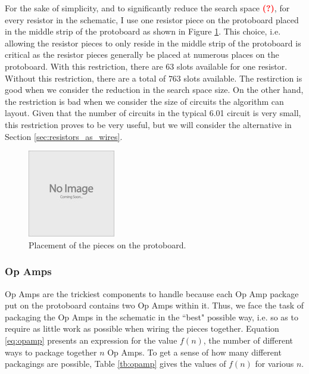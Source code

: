 For the sake of simplicity, and to significantly reduce the search space
\textcolor{red}{\textbf{(?)}}, for every resistor in the schematic, I use one
resistor piece on the protoboard placed in the middle strip of the protoboard
as shown in Figure \ref{fig:piece_placement}. This choice, i.e. allowing the
resistor pieces to only reside in the middle strip of the protoboard is critical
as the resistor pieces generally be placed at numerous places on the protoboard.
With this restriction, there are $63$ slots available for one resistor. Without
this restriction, there are a total of $763$ slots available. The restirction is
good when we consider the reduction in the search space size. On the other hand,
the restriction is bad when we
consider the size of circuits the algorithm can layout. Given that the number
of circuits in the typical 6.01 circuit is very small, this restriction proves
to be very useful, but we will consider the alternative in Section
\ref{sec:resistors_as_wires}.

\begin{figure}
\begin{center}
\includegraphics{Images/placeholder.jpg}
\caption{Placement of the pieces on the protoboard.}
\end{center}
\label{fig:piece_placement}
\end{figure}

\subsubsection{Op Amps}

Op Amps are the trickiest components to handle because each Op Amp package put
on the protoboard contains two Op Amps within it. Thus, we face the task of
packaging the Op Amps in the schematic in the ``best" possible way, i.e. so as
to require as little work as possible when wiring the pieces together. Equation
\ref{eq:opamp} presents an expression for the value $f(n)$, the number of
different ways
to package together $n$ Op Amps. To get a sense of how many different packagings
are possible, Table \ref{tb:opamp} gives the values of $f(n)$ for various $n$.

